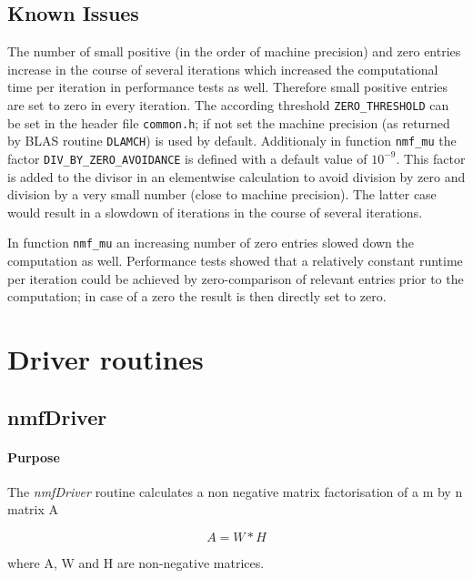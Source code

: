 \documentclass[a4paper,10pt]{scrartcl}
\begin{document}
	\subsection{Known Issues}

	The number of small positive (in the order of machine precision) and zero entries increase in the course of several iterations
	which increased the computational time per iteration in performance tests as well.
	Therefore small positive entries are set to zero in every iteration. The according threshold \texttt{ZERO\_THRESHOLD} can be set in the header file \texttt{common.h}; if not set the machine precision (as returned by BLAS routine \texttt{DLAMCH}) is used by default.
	Additionaly in function \texttt{nmf\_mu} the factor \texttt{DIV\_BY\_ZERO\_AVOIDANCE} is defined with a default value of $10^{-9}$. This factor is added to the divisor in an elementwise calculation to avoid division by zero and division by a very small number (close to machine precision). The latter case would result in a slowdown of iterations in the course of several iterations.

	In function \texttt{nmf\_mu} an increasing number of zero entries slowed down the computation as well. Performance tests showed that a relatively
	constant runtime per iteration could be achieved by zero-comparison of relevant entries prior to the computation; in case of a zero the result is then directly set to zero.	
	

	\section{Driver routines} 	

		\subsection{nmfDriver}

			\paragraph{Purpose}

					The \emph{nmfDriver} routine calculates a non negative matrix factorisation
					of a m by n matrix A
 	
					\begin{equation*}
 					A = W * H
					\end{equation*} 

 					where A, W and H are non-negative matrices.
\end{document}
